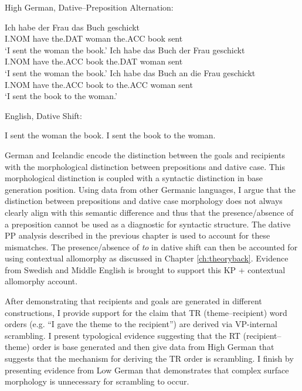 \begin{exe}
	\ex High German, Dative--Preposition Alternation: \label{ex:german-forms}
	\begin{xlist}
		 \ex \label{ex:german-1} \gll Ich habe der Frau das Buch geschickt\\
		 	 I.NOM have the.DAT woman the.ACC book sent\\
			 \trans `I sent the woman the book.'
		 \ex \label{ex:german-2} \gll Ich habe das Buch der Frau geschickt\\
			 I.NOM have the.ACC book the.DAT woman sent\\
			 \trans `I sent the woman the book.'
		 \ex \label{ex:german-3} \gll Ich habe das Buch an die Frau geschickt\\
			 I.NOM have the.ACC book to the.ACC woman sent\\
			 \trans `I sent the book to the woman.'
	\end{xlist}
	 English, Dative Shift:
	\begin{xlist}
		 I sent the woman the book.
		 I sent the book to the woman.
	\end{xlist}
\end{exe}

German and Icelandic encode the distinction between the goals and recipients with the morphological distinction between prepositions and dative case. This morphological distinction is coupled with a syntactic distinction in base generation position. Using data from other Germanic languages, I argue that the distinction between prepositions and dative case morphology does not always clearly align with this semantic difference and thus that the presence/absence of a preposition cannot be used as a diagnostic for syntactic structure. The dative PP analysis described in the previous chapter is used to account for these mismatches. The presence/absence of \textit{to} in dative shift can then be accounted for using contextual allomorphy as discussed in Chapter \ref{ch:theoryback}. Evidence from Swedish and Middle English is brought to support this KP + contextual allomorphy account.

After demonstrating that recipients and goals are generated in different constructions, I provide support for the claim that TR (theme--recipient) word orders (e.g. ``I gave the theme to the recipient'') are derived via VP-internal scrambling. I present typological evidence suggesting that the RT (recipient--theme) order is base generated and then give data from High German that suggests that the mechanism for deriving the TR order is scrambling. I finish by presenting evidence from Low German that demonstrates that complex surface morphology is unnecessary for scrambling to occur.


